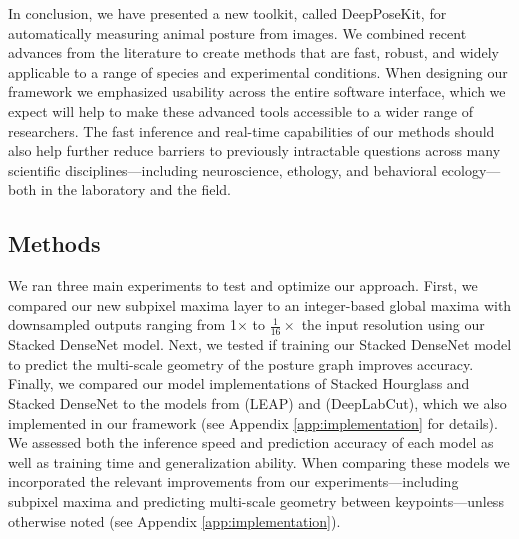 \documentclass[11pt,a4paper,oneside]{article}
\begin{document}
In conclusion, we have presented a new toolkit, called DeepPoseKit, for automatically measuring animal posture from images. We combined recent advances from the literature to create methods that are fast, robust, and widely applicable to a range of species and experimental conditions. When designing our framework we emphasized usability across the entire software interface, which we expect will help to make these advanced tools accessible to a wider range of researchers. The fast inference and real-time capabilities of our methods should also help further reduce barriers to previously intractable questions across many scientific disciplines—including neuroscience, ethology, and behavioral ecology—both in the laboratory and the field.


\subsection{Methods}

We ran three main experiments to test and optimize our approach. First, we compared our new subpixel maxima layer to an integer-based global maxima with downsampled outputs ranging from 1$\times$ to $\tfrac{1}{16}\times$ the input resolution using our Stacked DenseNet model. Next, we tested if training our Stacked DenseNet model to predict the multi-scale geometry of the posture graph improves accuracy. Finally, we compared our model implementations of Stacked Hourglass and Stacked DenseNet to the models from \cite{pereira2019fast} (LEAP) and \cite{mathis2018deeplabcut} (DeepLabCut), which we also implemented in our framework (see Appendix \ref{app:implementation} for details). We assessed both the inference speed and prediction accuracy of each model as well as training time and generalization ability. When comparing these models we incorporated the relevant improvements from our experiments—including subpixel maxima and predicting multi-scale geometry between keypoints—unless otherwise noted (see Appendix \ref{app:implementation}).
\end{document}
